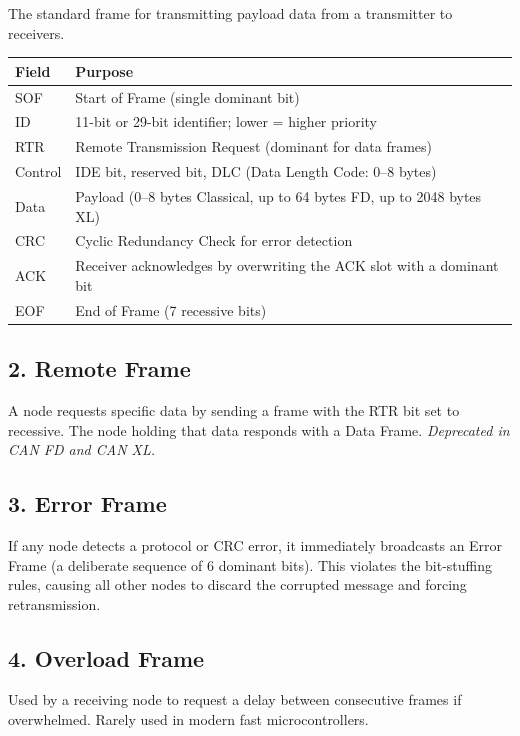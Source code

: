 \documentclass[12pt,a4paper,oneside]{report}
\begin{document}
The standard frame for transmitting payload data from a transmitter to
receivers.

\begin{longtable}[]{@{}ll@{}}
\toprule\noalign{}
Field & Purpose \\
\midrule\noalign{}
\endhead
\bottomrule\noalign{}
\endlastfoot
SOF & Start of Frame (single dominant bit) \\
ID & 11-bit or 29-bit identifier; lower = higher priority \\
RTR & Remote Transmission Request (dominant for data frames) \\
Control & IDE bit, reserved bit, DLC (Data Length Code: 0--8 bytes) \\
Data & Payload (0--8 bytes Classical, up to 64 bytes FD, up to 2048 bytes XL) \\
CRC & Cyclic Redundancy Check for error detection \\
ACK & Receiver acknowledges by overwriting the ACK slot with a dominant bit \\
EOF & End of Frame (7 recessive bits) \\
\end{longtable}

\subsection{2. Remote Frame}\label{remote-frame}

A node requests specific data by sending a frame with the RTR bit set to
recessive. The node holding that data responds with a Data Frame.
\emph{Deprecated in CAN FD and CAN XL.}

\subsection{3. Error Frame}\label{error-frame}

If any node detects a protocol or CRC error, it immediately broadcasts an Error
Frame (a deliberate sequence of 6 dominant bits). This violates the bit-stuffing
rules, causing all other nodes to discard the corrupted message and forcing
retransmission.

\subsection{4. Overload Frame}\label{overload-frame}

Used by a receiving node to request a delay between consecutive frames if
overwhelmed. Rarely used in modern fast microcontrollers.
\end{document}
